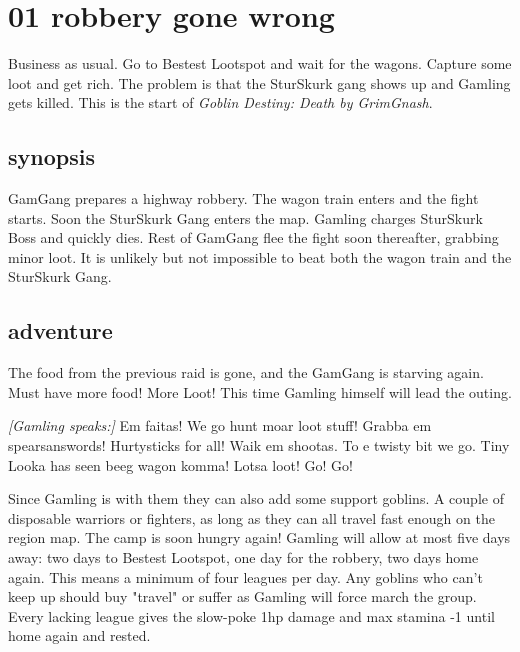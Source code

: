 \clearpage
\section*{01 robbery gone wrong}
\label{01robberygonewrong}

Business as usual. Go to Bestest Lootspot and wait for the wagons. Capture some loot and get rich. The problem is that the SturSkurk gang shows up and Gamling gets killed. This is the start of \emph{Goblin Destiny: Death by GrimGnash}.


\subsection*{synopsis}

GamGang prepares a highway robbery. The wagon train enters and the fight starts. Soon the SturSkurk Gang enters the map. Gamling charges SturSkurk Boss and quickly dies. Rest of GamGang flee the fight soon thereafter, grabbing minor loot. It is unlikely but not impossible to beat both the wagon train and the SturSkurk Gang.


\subsection*{adventure}

The food from the previous raid is gone, and the GamGang is starving again. Must have more food! More Loot! This time Gamling himself will lead the outing.

\begin{readoutloud}
\emph{[Gamling speaks:]}
Em faitas! We go hunt moar loot stuff! Grabba em spearsanswords! Hurtysticks for all! Waik em shootas. To e twisty bit we go. Tiny Looka has seen beeg wagon komma! Lotsa loot! Go! Go!
\end{readoutloud}

\noindent Since Gamling is with them they can also add some support goblins. A couple of disposable warriors or fighters, as long as they can all travel fast enough on the region map. The camp is soon hungry again! Gamling will allow at most five days away: two days to Bestest Lootspot, one day for the robbery, two days home again. This means a minimum of four leagues per day. Any goblins who can't keep up should buy "travel" or suffer as Gamling will force march the group. Every lacking league gives the slow-poke 1hp damage and max stamina -1 until home again and rested.


